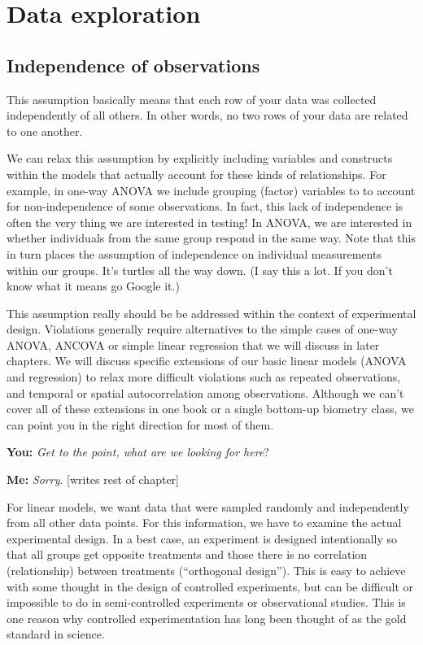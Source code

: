\documentclass[
]{book}
\begin{document}
\hypertarget{data-exploration}{%
\section{Data exploration}\label{data-exploration}}

\hypertarget{independence-of-observations}{%
\subsection{Independence of observations}\label{independence-of-observations}}

This assumption basically means that each row of your data was collected independently of all others. In other words, no two rows of your data are related to one another.

We can relax this assumption by explicitly including variables and constructs within the models that actually account for these kinds of relationships. For example, in one-way ANOVA we include grouping (factor) variables to to account for non-independence of some observations. In fact, this lack of independence is often the very thing we are interested in testing! In ANOVA, we are interested in whether individuals from the same group respond in the same way. Note that this in turn places the assumption of independence on individual measurements within our groups. It's turtles all the way down. (I say this a lot. If you don't know what it means go Google it.)

This assumption really should be be addressed within the context of experimental design. Violations generally require alternatives to the simple cases of one-way ANOVA, ANCOVA or simple linear regression that we will discuss in later chapters. We will discuss specific extensions of our basic linear models (ANOVA and regression) to relax more difficult violations such as repeated observations, and temporal or spatial autocorrelation among observations. Although we can't cover all of these extensions in one book or a single bottom-up biometry class, we can point you in the right direction for most of them.

\textbf{You:} \emph{Get to the point, what are we looking for here}?

\textbf{Me:} \emph{Sorry}. {[}writes rest of chapter{]}

For linear models, we want data that were sampled randomly and independently from all other data points. For this information, we have to examine the actual experimental design. In a best case, an experiment is designed intentionally so that all groups get opposite treatments and those there is no correlation (relationship) between treatments (``orthogonal design''). This is easy to achieve with some thought in the design of controlled experiments, but can be difficult or impossible to do in semi-controlled experiments or observational studies. This is one reason why controlled experimentation has long been thought of as the gold standard in science.
\end{document}

